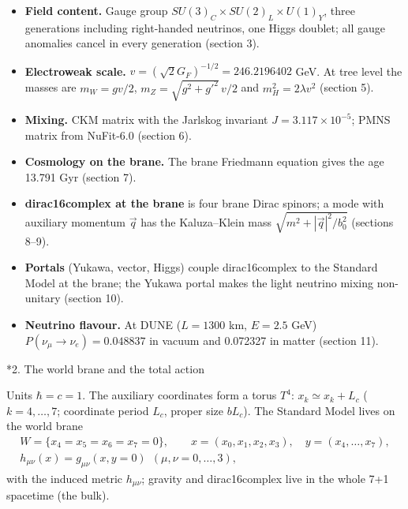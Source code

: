\documentclass[10pt,a4paper]{article}
\makeatletter
\renewcommand\section{\@startsection{section}{1}{\z@}{-3.5ex \@plus -1ex \@minus -.2ex}{2.3ex \@plus.2ex}{\normalfont\Large\bfseries\raggedright}}
\makeatother
\begin{document}
\begin{itemize}
\item \textbf{Field content.} Gauge group $SU(3)_C\times SU(2)_L\times U(1)_Y$, three generations including right-handed neutrinos, one Higgs doublet; all gauge anomalies cancel in every generation (section 3).
\item \textbf{Electroweak scale.} $v=(\sqrt2G_F)^{-1/2}=246.2196402$ GeV. At tree level the masses are $m_W=gv/2$, $m_Z=\sqrt{g^2+g'^2}\,v/2$ and $m_H^2=2\lambda v^2$ (section 5).
\item \textbf{Mixing.} CKM matrix with the Jarlskog invariant $J=3.117\times10^{-5}$; PMNS matrix from NuFit-6.0 (section 6).
\item \textbf{Cosmology on the brane.} The brane Friedmann equation gives the age 13.791 Gyr (section 7).
\item \textbf{dirac16complex at the brane} is four brane Dirac spinors; a mode with auxiliary momentum $\vec q$ has the Kaluza–Klein mass $\sqrt{m^2+|\vec q|^2/b_0^2}$ (sections 8–9).
\item \textbf{Portals} (Yukawa, vector, Higgs) couple dirac16complex to the Standard Model at the brane; the Yukawa portal makes the light neutrino mixing non-unitary (section 10).
\item \textbf{Neutrino flavour.} At DUNE ($L=1300$ km, $E=2.5$ GeV) $P(\nu_\mu\to\nu_e)=0.048837$ in vacuum and 0.072327 in matter (section 11).
\end{itemize}
\section*{2. The world brane and the total action}
Units $\hbar=c=1$. The auxiliary coordinates form a torus $T^4$: $x_k\simeq x_k+L_c$ ($k=4,\dots,7$; coordinate period $L_c$, proper size $bL_c$). The Standard Model lives on the world brane
\begin{gather*}
W=\{x_4=x_5=x_6=x_7=0\},\qquad x=(x_0,x_1,x_2,x_3),\quad y=(x_4,\dots,x_7),\\ h_{\mu\nu}(x)=g_{\mu\nu}(x,y=0)\ \ (\mu,\nu=0,\dots,3),
\end{gather*}
with the induced metric $h_{\mu\nu}$; gravity and dirac16complex live in the whole 7+1 spacetime (the bulk).
\end{document}
